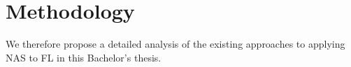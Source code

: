 


\section{Methodology}

We therefore propose a detailed analysis of the existing approaches to applying NAS to FL in this Bachelor's thesis.


